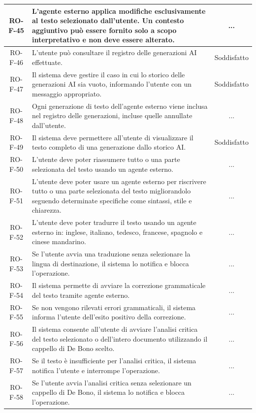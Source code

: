 \documentclass[11pt,a4paper]{article}
\begin{document}
\begin{longtable}{|c|p{11cm}|c|}
\hline
RO-F-45 & L'agente esterno applica modifiche esclusivamente al testo selezionato dall'utente. Un contesto aggiuntivo può essere fornito solo a scopo interpretativo e non deve essere alterato. & ... \\
\hline
RO-F-46 & L'utente può consultare il registro delle generazioni AI effettuate. & Soddisfatto \\
\hline
RO-F-47 & Il sistema deve gestire il caso in cui lo storico delle generazioni AI sia vuoto, informando l'utente con un messaggio appropriato. & Soddisfatto \\
\hline
RO-F-48 & Ogni generazione di testo dell'agente esterno viene inclusa nel registro delle generazioni, incluse quelle annullate dall'utente. & ... \\
\hline
RO-F-49 & Il sistema deve permettere all'utente di visualizzare il testo completo di una generazione dallo storico AI. & Soddisfatto \\
\hline
RO-F-50 & L'utente deve poter riassumere tutto o una parte selezionata del testo usando un agente esterno. & ... \\
\hline
RO-F-51 & L'utente deve poter usare un agente esterno per riscrivere tutto o una parte selezionata del testo migliorandolo seguendo determinate specifiche come sintassi, stile e chiarezza. & ... \\
\hline
RO-F-52 & L'utente deve poter tradurre il testo usando un agente esterno in: inglese, italiano, tedesco, francese, spagnolo e cinese mandarino. & ... \\
\hline
RO-F-53 & Se l'utente avvia una traduzione senza selezionare la lingua di destinazione, il sistema lo notifica e blocca l'operazione. & ... \\
\hline
RO-F-54 & Il sistema permette di avviare la correzione grammaticale del testo tramite agente esterno. & ... \\
\hline
RO-F-55 & Se non vengono rilevati errori grammaticali, il sistema informa l'utente dell'esito positivo della correzione. & ... \\
\hline
RO-F-56 & Il sistema consente all'utente di avviare l'analisi critica del testo selezionato o dell'intero documento utilizzando il cappello di De Bono scelto. & ... \\
\hline
RO-F-57 & Se il testo è insufficiente per l'analisi critica, il sistema notifica l'utente e interrompe l'operazione. & ... \\
\hline
RO-F-58 & Se l'utente avvia l'analisi critica senza selezionare un cappello di De Bono, il sistema lo notifica e blocca l'operazione. & ... \\

\end{longtable}
\end{document}
